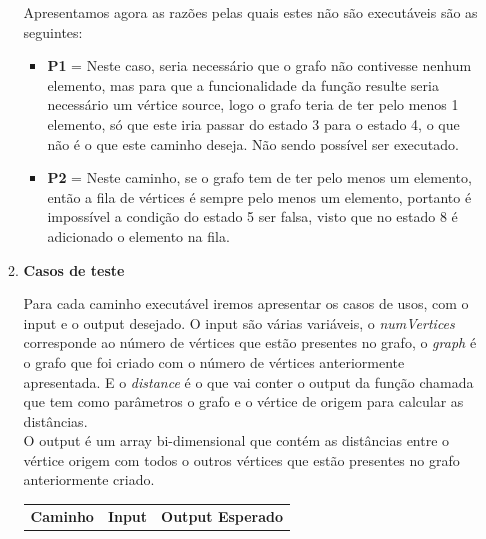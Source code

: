 \documentclass{article}
\begin{document}
\begin{itemize}
\begin{enumerate}
  \quad Apresentamos agora as razões pelas quais estes não são executáveis são as seguintes: \\
  \begin{itemize}
    \item \textbf{P1} = Neste caso, seria necessário que o grafo não contivesse nenhum elemento, mas para que a funcionalidade da função resulte seria necessário um vértice source, logo o grafo teria de ter pelo menos 1 elemento, só que este iria passar do estado 3 para o estado 4, o que não é o que este caminho deseja. Não sendo possível ser executado.\\
    \item \textbf{P2} = Neste caminho, se o grafo tem de ter pelo menos um elemento, então a fila de vértices é sempre pelo menos um elemento, portanto é impossível a condição do estado 5 ser falsa, visto que no estado 8 é adicionado o elemento na fila. 
  \end{itemize}


  \item \textbf{Casos de teste}\\
  \texttt{}\par Para cada caminho executável iremos apresentar os casos de usos, com o input e o output desejado.
 O input são várias variáveis, o \textit{numVertices} corresponde ao número de vértices que estão presentes no grafo, o \textit{graph} é o grafo que foi criado com o número de vértices anteriormente apresentada. E o \textit{distance} é o que vai conter o output da função chamada que tem como parâmetros o grafo e o vértice de origem para calcular as distâncias.\\

 O output é um array bi-dimensional que contém as distâncias entre o vértice origem com todos o outros vértices que estão presentes no grafo anteriormente criado.\\


\begin{table}[H]
    \centering
    \begin{tabular}{|c|p{7cm}|p{3cm}|} %
    \hline
    \textbf{Caminho} & \textbf{Input} & \textbf{Output Esperado} \\
                        

\end{tabular}
\end{table}
\end{enumerate}
\end{itemize}
\end{document}
